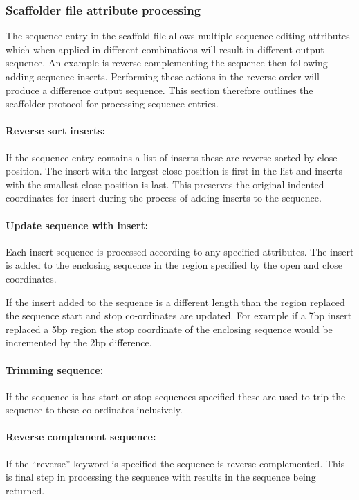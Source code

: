\documentclass[10pt]{bmc_article}
\newenvironment{bmcformat}{\begin{raggedright}\baselineskip20pt\sloppy\setboolean{publ}{false}}{\end{raggedright}\baselineskip20pt\sloppy}
\begin{document}
\begin{bmcformat}
\subsubsection*{Scaffolder file attribute processing} %

The sequence entry in the scaffold file allows multiple sequence-editing
attributes which when applied in different combinations will result in
different output sequence. An example is reverse complementing the sequence
then following adding sequence inserts. Performing these actions in the reverse
order will produce a difference output sequence. This section therefore
outlines the scaffolder protocol for processing sequence entries. \pb

\paragraph{Reverse sort inserts:} If the sequence entry contains a list of
inserts these are reverse sorted by close position. The insert with the
largest close position is first in the list and inserts with the smallest
close position is last. This preserves the original indented coordinates for
insert during the process of adding inserts to the sequence. \pb

\paragraph{Update sequence with insert:} Each insert sequence is processed
according to any specified attributes. The insert is added to the enclosing
sequence in the region specified by the open and close coordinates. \pb

If the insert added to the sequence is a different length than the region
replaced the sequence start and stop co-ordinates are updated. For example if
a 7bp insert replaced a 5bp region the stop coordinate of the enclosing
sequence would be incremented by the 2bp difference. \pb

\paragraph{Trimming sequence:} If the sequence is has start or stop sequences
specified these are used to trip the sequence to these co-ordinates
inclusively. \pb 

\paragraph{Reverse complement sequence:} If the ``reverse'' keyword is
specified the sequence is reverse complemented. This is final step in
processing the sequence with results in the sequence being returned. \pb


\end{bmcformat}
\end{document}
